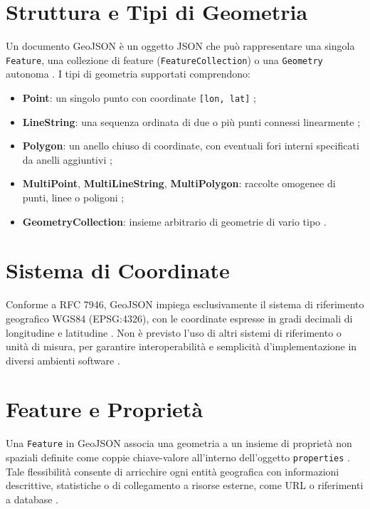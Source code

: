 \section{Struttura e Tipi di Geometria}
Un documento GeoJSON è un oggetto JSON che può rappresentare una singola \texttt{Feature},
una collezione di feature (\texttt{FeatureCollection}) o una \texttt{Geometry}
autonoma \cite{geojson-spec}. I tipi di geometria supportati comprendono:
\begin{itemize}
  \item \textbf{Point}: un singolo punto con coordinate \texttt{[lon, lat]}
    \cite{geojson-wiki};

  \item \textbf{LineString}: una sequenza ordinata di due o più punti connessi linearmente
    \cite{geojson-wiki};

  \item \textbf{Polygon}: un anello chiuso di coordinate, con eventuali fori
    interni specificati da anelli aggiuntivi \cite{geojson-wiki};

  \item \textbf{MultiPoint}, \textbf{MultiLineString}, \textbf{MultiPolygon}: raccolte
    omogenee di punti, linee o poligoni \cite{geojson-wiki};

  \item \textbf{GeometryCollection}: insieme arbitrario di geometrie di vario tipo
    \cite{geojson-spec}.
\end{itemize}

\section{Sistema di Coordinate}
Conforme a RFC 7946, GeoJSON impiega esclusivamente il sistema di riferimento
geografico WGS84 (EPSG:4326), con le coordinate espresse in gradi decimali di longitudine
e latitudine \cite{rfc7946}. Non è previsto l'uso di altri sistemi di
riferimento o unità di misura, per garantire interoperabilità e semplicità d'implementazione
in diversi ambienti software \cite{ibm-geojson}.

\section{Feature e Proprietà}
Una \texttt{Feature} in GeoJSON associa una geometria a un insieme di proprietà
non spaziali definite come coppie chiave-valore all'interno dell'oggetto \texttt{properties}
\cite{geojson-spec}. Tale flessibilità consente di arricchire ogni entità
geografica con informazioni descrittive, statistiche o di collegamento a risorse
esterne, come URL o riferimenti a database \cite{geojson-wiki}.

